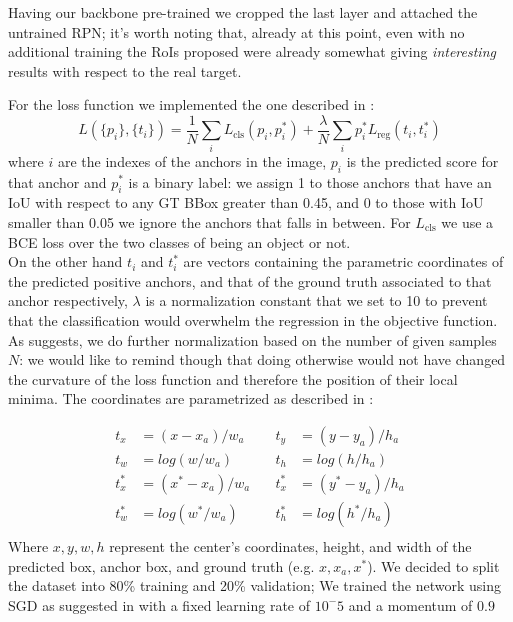 \documentclass[10pt,journal,cspaper,compsoc]{IEEEtran}
\begin{document}
	Having our backbone pre-trained we cropped the last layer and attached the untrained RPN; it's worth noting that, already at this point, even with no additional training the RoIs proposed were already somewhat giving \emph{interesting} results with respect to the real target. 

    For the loss function we implemented the one described in \cite{arxiv:FasterRCNN}:
	\begin{equation}\label{eq:loss}
        L(\{p_i\}, \{t_i\}) = \frac{1}{N}\sum_i  L_\mathrm{cls}(p_i, p_i^*) +\frac{\lambda}{N} \sum_i p_i^* L_\mathrm{reg}(t_i, t_i^*)
    \end{equation}
	where $i$ are the indexes of the anchors in the image, $p_i$ is the predicted score for that anchor and $p_i^*$ is a binary label: we assign 1 to those anchors that have an IoU with respect to any GT BBox greater than 0.45, and 0 to those with IoU smaller than 0.05 we ignore the anchors that falls in between. For $L_\mathrm{cls}$  we use a BCE loss over the two classes of being an object or not. \\On the other hand $t_i$ and $t_i^*$ are vectors containing the parametric coordinates of the predicted positive anchors, and that of the ground truth associated to that anchor respectively, $\lambda$ is a normalization constant that we set to 10 to prevent that the classification would overwhelm the regression in the objective function. As \cite{arxiv:FasterRCNN} suggests, we do further normalization based on the number of given samples $N$: we would like to remind though that doing otherwise would not have changed the curvature of the loss function and therefore the position of their local minima.
    The coordinates are parametrized as described in \cite{arxiv:FasterRCNN} : 

\begin{equation}\label{eq:reg_transf}
\begin{aligned}
t_x &= (x - x_a)/w_a \quad  &t_y &=(y - y_a)/h_a \\
t_w &= log(w/w_a) \quad &t_h &= log (h/h_a) \\
t_x^* &= (x^* - x_a)/w_a \quad &t_x^* &= (y^* - y_a)/h_a \\
t_w^* &= log(w^*/w_a) \quad  &t_h^*  &= log(h^*/h_a) \\
\end{aligned}
\end{equation}
Where $x,y,w,h$ represent the center's coordinates, height, and width of the predicted box, anchor box, and ground truth (e.g. $x, x_a, x^*$). 
We decided to split the dataset into 80\% training and 20\% validation; We trained the network using SGD as suggested in \cite{arxiv:FasterRCNN} with a fixed learning rate of $10^-5$ and a momentum of $0.9$
    
\end{document}
